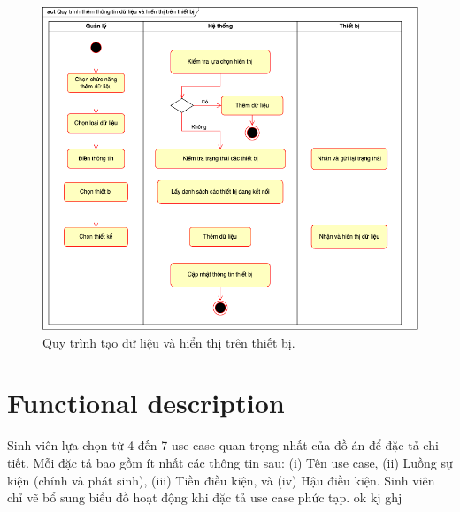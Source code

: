 \documentclass[../Main.tex]{subfiles}
\begin{document}
\begin{figure}[H]
    \centering
    \includegraphics[scale=0.6]{doc/thesis/EN/imgs/act_new-data.png}
    \caption{Quy trình tạo dữ liệu và hiển thị trên thiết bị.}
    \label{fig:uc-general}
\end{figure}

\section{Functional description}
\label{section:2.3}
Sinh viên lựa chọn từ 4 đến 7 use case quan trọng nhất của đồ án để đặc tả chi tiết. Mỗi đặc tả bao gồm ít nhất các thông tin sau: (i) Tên use case, (ii) Luồng sự kiện (chính và phát sinh), (iii) Tiền điều kiện, và (iv) Hậu điều kiện. Sinh viên chỉ vẽ bổ sung biểu đồ hoạt động khi đặc tả use case phức tạp. ok kj ghj
\end{document}
